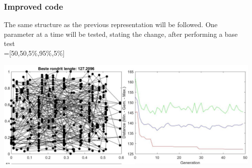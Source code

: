 \subsubsection{Improved code}

The same structure as the previous representation will be followed. One
parameter at a time will be tested, stating the change, after
performing a base test
\\
 =[50,50,5\%,95\%,5\%]

\includegraphics[width=\textwidth]{img/specific/order_crossover/general_1.jpg}

